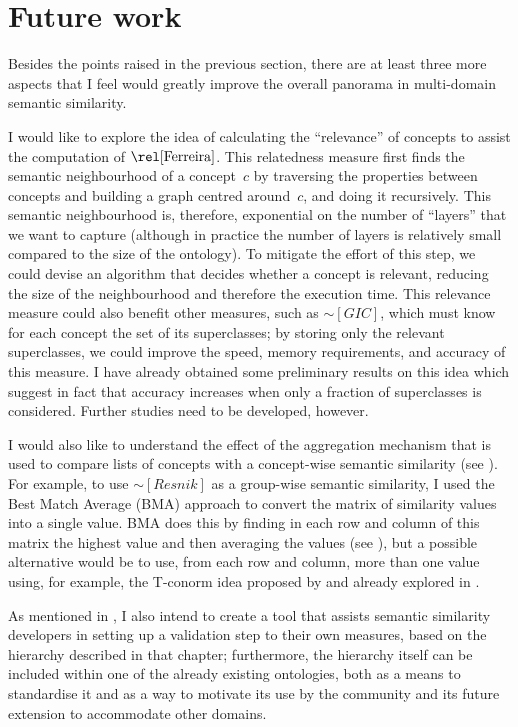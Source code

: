 \section{Future work} \label{sec:conclusions/future}

Besides the points raised in the previous section, there are at least three more aspects that I feel would greatly improve the overall panorama in multi-domain semantic similarity.

I would like to explore the idea of calculating the ``relevance'' of concepts to assist the computation of $\ferreira$. This relatedness measure first finds the semantic neighbourhood of a concept~$c$ by traversing the properties between concepts and building a graph centred around~$c$, and doing it recursively. This semantic neighbourhood is, therefore, exponential on the number of ``layers'' that we want to capture (although in practice the number of layers is relatively small compared to the size of the ontology). To mitigate the effort of this step, we could devise an algorithm that decides whether a concept is relevant, reducing the size of the neighbourhood and therefore the execution time. This relevance measure could also benefit other measures, such as $\sim[GIC]$, which must know for each concept the set of its superclasses; by storing only the relevant superclasses, we could improve the speed, memory requirements, and accuracy of this measure. I have already obtained some preliminary results on this idea which suggest in fact that accuracy increases when only a fraction of superclasses is considered. Further studies need to be developed, however.

I would also like to understand the effect of the aggregation mechanism that is used to compare lists of concepts with a concept-wise semantic similarity (see ). For example, to use $\sim[Resnik]$ as a group-wise semantic similarity, I used the Best Match Average (BMA) approach to convert the matrix of similarity values into a single value. BMA does this by finding in each row and column of this matrix the highest value and then averaging the values (see ), but a possible alternative would be to use, from each row and column, more than one value using, for example, the T-conorm idea proposed by \citet{Lehmann2012a} and already explored in .

As mentioned in , I also intend to create a tool that assists semantic similarity developers in setting up a validation step to their own measures, based on the hierarchy described in that chapter; furthermore, the hierarchy itself can be included within one of the already existing ontologies, both as a means to standardise it and as a way to motivate its use by the community and its future extension to accommodate other domains.

